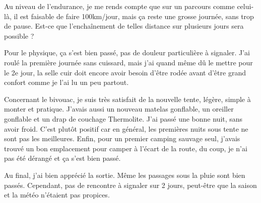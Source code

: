  Au niveau de l'endurance, je me rends compte que sur un parcours comme celui-là, il est faisable de faire 100km/jour, mais ça reste une grosse journée, sans trop de pause. Est-ce que l'enchaînement de telles distance sur plusieurs jours sera possible ?

 Pour le physique, ça s'est bien passé, pas de douleur particulière à signaler. J'ai roulé la première journée sans cuissard, mais j'ai quand même dû le mettre pour le 2e jour, la selle cuir doit encore avoir besoin d'être rodée avant d'être grand confort comme je l'ai lu un peu partout.

 Concernant le bivouac, je suis très satisfait de la nouvelle tente, légère, simple à monter et pratique. J'avais aussi un nouveau matelas gonflable, un oreiller gonflable et un drap de couchage Thermolite. J'ai passé une bonne nuit, sans avoir froid. C'est plutôt positif car en général, les premières nuits sous tente ne sont pas les meilleures. Enfin, pour un premier camping sauvage seul, j'avais trouvé un bon emplacement pour camper à l'écart de la route, du coup, je n'ai pas été dérangé et ça s'est bien passé.

 Au final, j'ai bien apprécié la sortie. Même les passages sous la pluie sont bien passés. Cependant, pas de rencontre à signaler sur 2 jours, peut-être que la saison et la météo n'étaient pas propices. 
